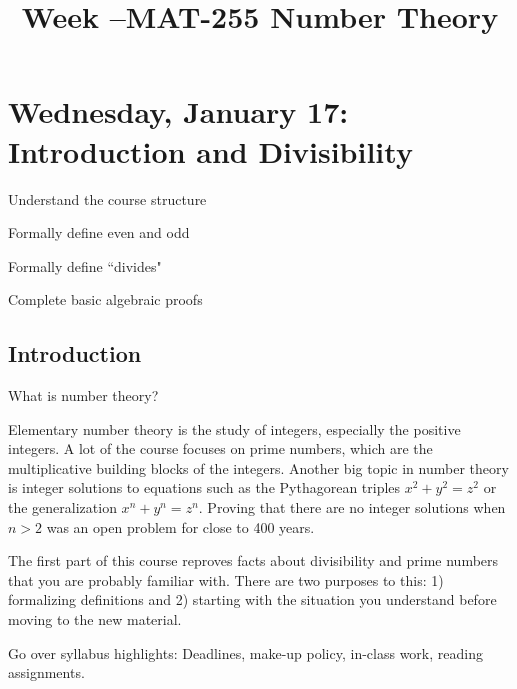 \documentclass{ximera}
\title{Week \week--MAT-255 Number Theory}
\begin{document}
\section{Wednesday, January 17: Introduction and Divisibility}

\begin{obj}
\item  Understand the course structure
\item  Formally define even and odd
\item Formally define ``divides"
\item Complete basic algebraic proofs
\end{obj}

\subsection{Introduction }%

What is number theory?

Elementary number theory is the study of integers, especially the positive integers. A lot of the course focuses on prime numbers, which are the multiplicative building blocks of the integers. Another big topic in number theory is integer solutions to equations such as the Pythagorean triples $x^2+y^2=z^2$ or the generalization $x^n+y^n=z^n$. Proving that there are no integer solutions when $n>2$ was an open problem for close to 400 years.

The first part of this course reproves facts about divisibility and prime numbers that you are probably familiar with. There are two purposes to this: 1) formalizing definitions and 2) starting with the situation you understand before moving to the new material.

Go over syllabus highlights: Deadlines, make-up policy, in-class work, reading assignments.


\end{document}
